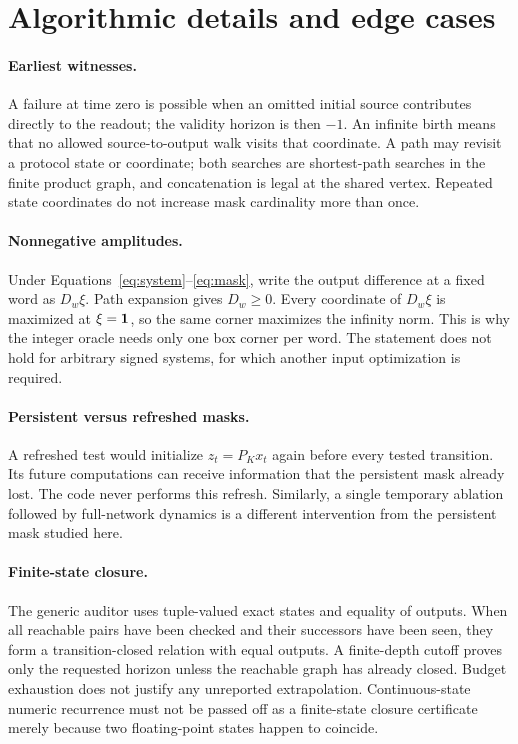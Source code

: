 \section{Algorithmic details and edge cases}
\paragraph{Earliest witnesses.} A failure at time zero is possible when an omitted initial source contributes directly to the readout; the validity horizon is then $-1$. An infinite birth means that no allowed source-to-output walk visits that coordinate. A path may revisit a protocol state or coordinate; both searches are shortest-path searches in the finite product graph, and concatenation is legal at the shared vertex. Repeated state coordinates do not increase mask cardinality more than once.

\paragraph{Nonnegative amplitudes.} Under Equations~\eqref{eq:system}--\eqref{eq:mask}, write the output difference at a fixed word as $D_w\xi$. Path expansion gives $D_w\ge0$. Every coordinate of $D_w\xi$ is maximized at $\xi=\mathbf 1$, so the same corner maximizes the infinity norm. This is why the integer oracle needs only one box corner per word. The statement does not hold for arbitrary signed systems, for which another input optimization is required.

\paragraph{Persistent versus refreshed masks.} A refreshed test would initialize $z_t=P_Kx_t$ again before every tested transition. Its future computations can receive information that the persistent mask already lost. The code never performs this refresh. Similarly, a single temporary ablation followed by full-network dynamics is a different intervention from the persistent mask studied here.

\paragraph{Finite-state closure.} The generic auditor uses tuple-valued exact states and equality of outputs. When all reachable pairs have been checked and their successors have been seen, they form a transition-closed relation with equal outputs. A finite-depth cutoff proves only the requested horizon unless the reachable graph has already closed. Budget exhaustion does not justify any unreported extrapolation. Continuous-state numeric recurrence must not be passed off as a finite-state closure certificate merely because two floating-point states happen to coincide.

